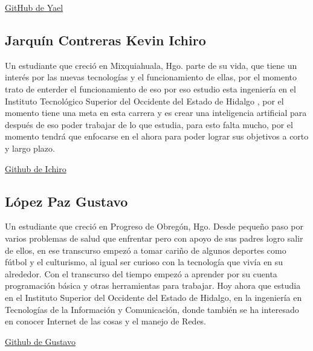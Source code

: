 \documentclass[conference]{IEEEtran}
\begin{document}
\href{https://github.com/YaelDoncic}{GitHub de Yael}\\

\subsection{\textbf{Jarquín Contreras Kevin Ichiro}}

Un estudiante que creció en Mixquiahuala, Hgo. parte de su vida, que tiene un interés por las nuevas tecnologías y el funcionamiento de ellas, por el momento trato de enterder el funcionamiento de eso por eso estudio esta ingeniería en el Instituto Tecnológico Superior del Occidente del Estado de Hidalgo , por el momento tiene una meta en esta carrera y es crear una inteligencia artificial para después de eso poder trabajar de lo que estudia, para esto falta mucho, por el momento tendrá que enfocarse en el ahora para poder lograr sus objetivos a corto y largo plazo.

\href{https://github.com/ichirocontreras}{Github de Ichiro}\\

\subsection{\textbf{López Paz Gustavo}}
Un estudiante que creció en Progreso de Obregón, Hgo. Desde pequeño paso por varios problemas de salud que enfrentar pero con apoyo de sus padres logro salir de ellos, en ese transcurso empezó a tomar cariño de algunos deportes como fútbol y el culturismo, al igual ser curioso con la tecnología que vivía en su alrededor. Con el transcurso del tiempo empezó a aprender por su cuenta programación básica y otras herramientas para trabajar. Hoy ahora que estudia en el Instituto Superior del Occidente del Estado de Hidalgo, en la ingeniería en Tecnologías de la Información y Comunicación, donde también se ha interesado en conocer Internet de las cosas y el manejo de Redes.

\href{https://github.com/Gustavo1Lopez2Paz}{Github de Gustavo}\\
\end{document}
